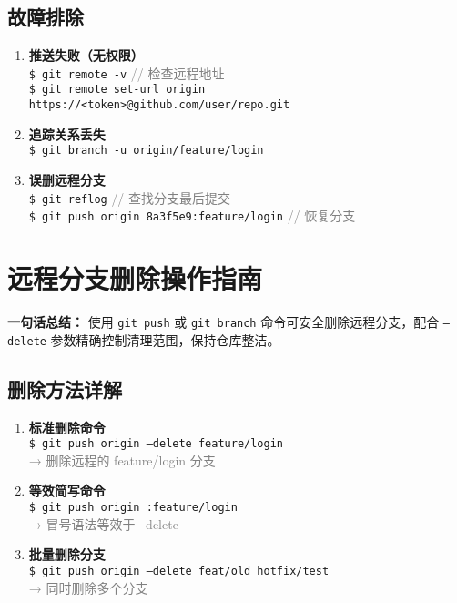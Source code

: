 \subsection{故障排除}
\begin{enumerate}[leftmargin=*, nosep]
    \item \textbf{推送失败（无权限）} \\
    \texttt{\$ git remote -v} \quad \textcolor{gray}{// 检查远程地址} \\
    \texttt{\$ git remote set-url origin https://<token>@github.com/user/repo.git}
    
    \item \textbf{追踪关系丢失} \\
    \texttt{\$ git branch -u origin/feature/login}
    
    \item \textbf{误删远程分支} \\
    \texttt{\$ git reflog} \quad \textcolor{gray}{// 查找分支最后提交} \\
    \texttt{\$ git push origin 8a3f5e9:feature/login} \quad \textcolor{gray}{// 恢复分支}
\end{enumerate}

\section{远程分支删除操作指南}
\textbf{一句话总结：}  
使用 \texttt{git push} 或 \texttt{git branch} 命令可安全删除远程分支，配合 \texttt{--delete} 参数精确控制清理范围，保持仓库整洁。

\subsection{删除方法详解}
\begin{enumerate}[leftmargin=*, nosep]
    \item \textbf{标准删除命令} \\
    \texttt{\$ git push origin --delete feature/login} \\
    \textcolor{gray}{→ 删除远程的 feature/login 分支}
    
    \item \textbf{等效简写命令} \\
    \texttt{\$ git push origin :feature/login} \\
    \textcolor{gray}{→ 冒号语法等效于 --delete}
    
    \item \textbf{批量删除分支} \\
    \texttt{\$ git push origin --delete feat/old hotfix/test} \\
    \textcolor{gray}{→ 同时删除多个分支}
\end{enumerate}

